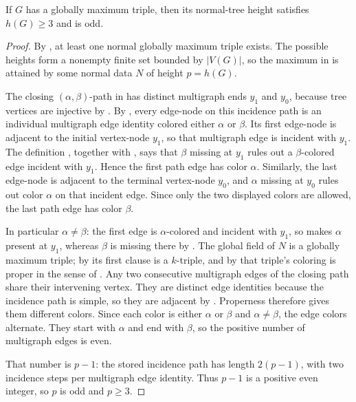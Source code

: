 \begin{lemma}
If $G$ has a globally maximum triple, then its normal-tree height satisfies
$h(G)\ge 3$ and is odd.
\end{lemma}
\begin{proof}
By , at least one normal globally maximum
triple exists.  The possible heights form a nonempty finite set bounded by
$|V(G)|$, so the maximum in  is attained by
some normal data $N$ of height $p=h(G)$.

The closing $(\alpha,\beta)$-path in
 has distinct multigraph ends $y_1$ and
$y_0$, because tree vertices are injective by .
By , every edge-node on this incidence path
is an individual multigraph edge identity colored either $\alpha$ or
$\beta$.  Its first edge-node is adjacent to the initial vertex-node
$y_1$, so that multigraph edge is incident with $y_1$.  The definition
, together with , says that
$\beta$ missing at $y_1$ rules out a $\beta$-colored edge incident with
$y_1$.  Hence the first path edge has color $\alpha$.  Similarly, the last
edge-node is adjacent to the terminal vertex-node $y_0$, and $\alpha$
missing at $y_0$ rules out color $\alpha$ on that incident edge.  Since
only the two displayed colors are allowed, the last path edge has color
$\beta$.

In particular $\alpha\ne\beta$: the first edge is $\alpha$-colored and
incident with $y_1$, so  makes $\alpha$ present at
$y_1$, whereas $\beta$ is missing there by .  The
global field of $N$ is a globally maximum triple; by
 its first clause is a $k$-triple, and by
 that triple's coloring is proper in the sense of
.  Any two consecutive multigraph edges of
the closing path share their intervening vertex.  They are distinct edge
identities because the incidence path is simple, so they are adjacent by
.  Properness therefore gives them different
colors.  Since each color is either $\alpha$ or $\beta$ and
$\alpha\ne\beta$, the edge colors alternate.  They start with $\alpha$ and
end with $\beta$, so the positive number of multigraph edges is even.

That number is $p-1$: the stored incidence path has length $2(p-1)$, with
two incidence steps per multigraph edge identity.  Thus $p-1$ is a positive
even integer, so $p$ is odd and $p\ge3$.
\end{proof}
